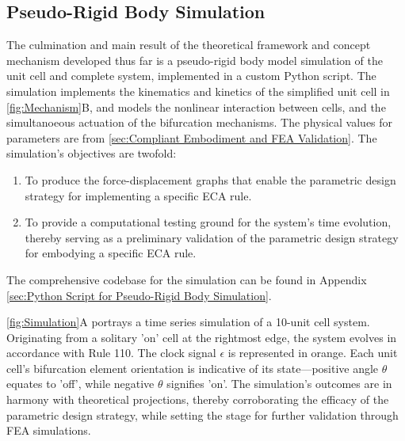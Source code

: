\subsection*{Pseudo-Rigid Body Simulation}


The culmination and main result of the theoretical framework and concept mechanism developed thus far is a pseudo-rigid body model simulation of the unit cell and complete system, implemented in a custom Python script. The simulation implements the kinematics and kinetics of the simplified unit cell in \autoref*{fig:Mechanism}B, and models the nonlinear interaction between cells, and the simultanoeous actuation of the bifurcation mechanisms. The physical values for parameters are from \ref*{sec:Compliant Embodiment and FEA Validation}. 
The simulation's objectives are twofold:
\begin{enumerate}
    \item To produce the force-displacement graphs that enable the parametric design strategy for implementing a specific ECA rule.
    \item To provide a computational testing ground for the system's time evolution, thereby serving as a preliminary validation of the parametric design strategy for embodying a specific ECA rule.
\end{enumerate}



The comprehensive codebase for the simulation can be found in Appendix \ref*{sec:Python Script for Pseudo-Rigid Body Simulation}.

\autoref*{fig:Simulation}A portrays a time series simulation of a 10-unit cell system. Originating from a solitary 'on' cell at the rightmost edge, the system evolves in accordance with Rule 110. The clock signal \( \epsilon \) is represented in orange. Each unit cell's bifurcation element orientation is indicative of its state—positive angle \( \theta \) equates to 'off', while negative \( \theta \) signifies 'on'. The simulation's outcomes are in harmony with theoretical projections, thereby corroborating the efficacy of the parametric design strategy, while setting the stage for further validation through FEA simulations.





